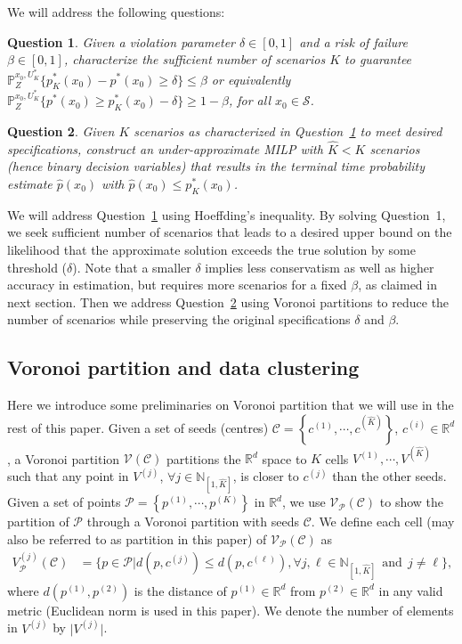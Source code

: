 \documentclass[11pt,letterpaper]{article}
\newtheorem{question}{Question}
\newcommand{\R}{\mathbb{R}}
\newcommand{\N}{\mathbb{N}}
\newcommand{\mcS}{\mathcal{S}}
\newcommand{\mcP}{\mathcal{P}}
\newcommand{\mcV}{\mathcal{V}}
\newcommand{\mcC}{\mathcal{C}}
\newcommand{\Prob}{\mathbb{P}}
\begin{document}
	We will address the following questions:
	\begin{question}\label{ques:Bound}
{\color{black}Given a violation parameter $\delta\in[0,1]$ and a risk of failure $\beta\in[0,1]$,  characterize the sufficient number of scenarios $K$ to guarantee $\Prob_{Z}^{x_0, U^\ast_K}\{ p_{K}^\ast(x_0) - p^{\ast}(x_0) \geq \delta\}\leq \beta$ or equivalently $\Prob_{Z}^{x_0, U^\ast_K}\{ p^{\ast}(x_0) \geq p_{K}^\ast(x_0)-\delta \}\geq 1-\beta$, for all $x_0\in \mcS$.}
        

	\end{question}
	\begin{question}\label{ques:Voronoi}
		{\color{black}Given $K$ scenarios as characterized in Question~\ref{ques:Bound} to meet desired specifications, construct an under-approximate MILP with $\hat{K}<K$ scenarios (hence binary decision variables) that results in the terminal time probability estimate $\hat{p}(x_0)$ with $\hat{p}(x_0)\leq p_{K}^{\ast}(x_0)$. }
	\end{question}

    We will address Question~\ref{ques:Bound} using Hoeffding's inequality. By solving Question~1, we seek sufficient number of  scenarios that leads to a desired upper bound on the likelihood that the approximate solution exceeds the true solution by some threshold ($\delta$). 
{\color{black}Note that a smaller $\delta$ implies less conservatism as well as higher accuracy in estimation, but requires more scenarios for a fixed $\beta$, as claimed in next section. Then we address Question~\ref{ques:Voronoi} using Voronoi partitions to reduce the number of scenarios while preserving the original specifications $\delta$ and $\beta$.}
\subsection{Voronoi partition and data clustering}
	\label{sec:VoronoiClustering}
{\color{black}Here we introduce some preliminaries on Voronoi partition that we will use in the rest of this paper. }
Given a set of seeds (centres) $\mcC=\left\{c^{(1)},\cdots,c^{(\hat{K})}\right\}$, $c^{(i)}\in\R^{d}$,
    a Voronoi partition $\mcV(\mcC)$ partitions the $\R^d$ space to $\hat{K}$
    cells $V^{(1)},\cdots,V^{(\hat{K})}$ such that any point in $V^{(j)}$,
    $\forall j\in\N_{[1,\hat{K}]}$, is closer to $c^{(j)}$ than the other
    seeds. Given a set of points $\mcP=\left\{p^{(1)},\cdots,p^{(K)}\right\}$ in  $\R^d$, we use $\mcV_{\mcP}(\mcC)$ to show the partition of $\mcP$ through a Voronoi partition with seeds $\mcC$. We define each cell (may also be referred to as partition in this paper) of $\mcV_{\mcP}(\mcC)$ as
	\begin{align}
        V^{(j)}_{\mcP}(\mcC)&=\{p\in \mcP|d(p,c^{(j)})\leq
            d(p,c^{(\ell)}), \forall j,\ell\in\N_{[1,\hat{K}]} ~~\text{and}~~ j\neq\ell   \},\label{eq:V_j}
	\end{align}
	where $d(p^{(1)},p^{(2)})$ is the distance of $p^{(1)}\in \R^d$ from $p^{(2)}\in \R^d$ in any valid metric (Euclidean norm is used in this paper). 
    We denote the number of elements in $V^{(j)}$ by $ \vert V^{(j)} \vert$.  
\end{document}
